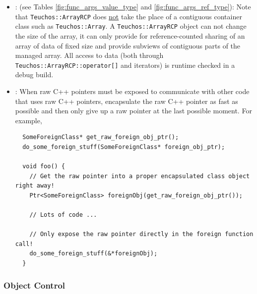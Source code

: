 \begin{itemize}
{}\item\GCGTeuchosArrayRCP: (see Tables
{}\ref{fig:func_args_value_type} and {}\ref{fig:func_args_ref_type}):
Note that {}\texttt{Teuchos::ArrayRCP} does {}\underline{not} take the
place of a contiguous container class such as
{}\texttt{Teuchos::\-Array}.  A {}\texttt{Teuchos::ArrayRCP} object
can not change the size of the array, it can only provide for
reference-counted sharing of an array of data of fixed size and
provide subviews of contiguous parts of the managed array.  All access
to data (both through {}\texttt{Teuchos::\-ArrayRCP::\-operator[]} and
iterators) is runtime checked in a debug build.

{}\item\GCGPostponeRawPointers: When raw C++ pointers must be exposed to
communicate with other code that uses raw C++ pointers, encapsulate the raw
C++ pointer as fast as possible and then only give up a raw pointer at the
last possible moment.  For example, 

{\small\begin{verbatim}
  SomeForeignClass* get_raw_foreign_obj_ptr();
  do_some_foreign_stuff(SomeForeignClass* foreign_obj_ptr);

  void foo() {
    // Get the raw pointer into a proper encapsulated class object right away!
    Ptr<SomeForeignClass> foreignObj(get_raw_foreign_obj_ptr());

    // Lots of code ...

    // Only expose the raw pointer directly in the foreign function call! 
    do_some_foreign_stuff(&*foreignObj);
  }
\end{verbatim}}

\end{itemize}


%
\subsubsection{Object Control}
%

